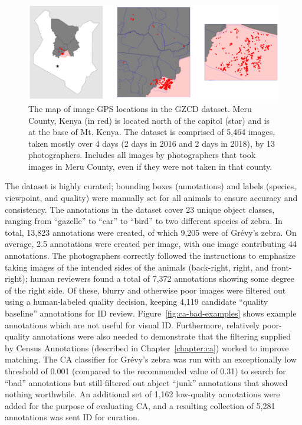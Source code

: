\begin{figure}[!t]
    \begin{center}
        \includegraphics[width=0.90\linewidth]{resources/ca-map.pdf}
    \end{center}
    \caption{The map of image GPS locations in the GZCD dataset.  Meru County, Kenya (in red) is located north of the capitol (star) and is at the base of Mt. Kenya.  The dataset is comprised of 5,464 images, taken mostly over 4 days (2 days in 2016 and 2 days in 2018), by 13 photographers.  Includes all images by photographers that took images in Meru County, even if they were not taken in that county.}
    \label{fig:ca-map}
\end{figure}

The dataset is highly curated; bounding boxes (annotations) and labels (species, viewpoint, and quality) were manually set for all animals to ensure accuracy and consistency.
The annotations in the dataset cover 23 unique object classes, ranging from ``gazelle'' to ``car'' to ``bird'' to two different species of zebra.  In total, 13,823 annotations were created, of which 9,205 were of Gr\'evy's zebra.  On average, 2.5 annotations were created per image, with one image contributing 44 annotations.  The photographers correctly followed the instructions to emphasize taking images of the intended sides of the animals (back-right, right, and front-right); human reviewers found a total of 7,372 annotations showing some degree of the right side.  Of these, blurry and otherwise poor images were filtered out using a human-labeled quality decision, keeping 4,119 candidate ``quality baseline'' annotations for ID review.  Figure~\ref{fig:ca-bad-examples} shows example annotations which are not useful for visual ID.  Furthermore, relatively poor-quality annotations were also needed to demonstrate that the filtering supplied by Census Annotations (described in Chapter~\ref{chapter:ca}) worked to improve matching.  The CA classifier for Gr\'evy's zebra was run with an exceptionally low threshold of 0.001 (compared to the recommended value of 0.31) to search for ``bad'' annotations but still filtered out abject ``junk'' annotations that showed nothing worthwhile.  An additional set of 1,162 low-quality annotations were added for the purpose of evaluating CA, and a resulting collection of 5,281 annotations was sent ID for curation.


